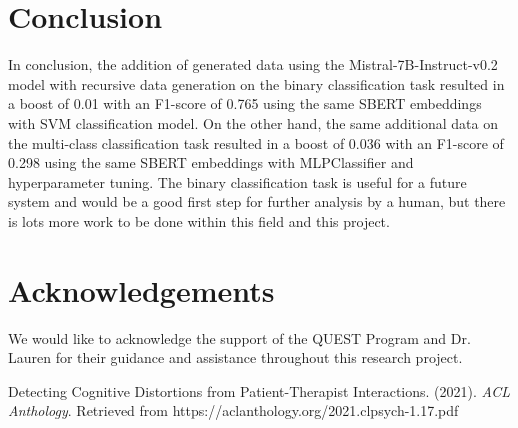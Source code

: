 \documentclass[a0,landscape]{a0poster}
\begin{document}
\begin{multicols}{4}
\color{Teal}
\section*{Conclusion}
\color{Black}

In conclusion, the addition of generated data using the Mistral-7B-Instruct-v0.2 model with recursive data generation on the binary classification task 
resulted in a boost of 0.01 with an F1-score of 0.765 using the same SBERT embeddings with SVM classification model. 
On the other hand, the same additional data on the multi-class classification task resulted in a boost of 0.036 with an F1-score of 0.298 
using the same SBERT embeddings with MLPClassifier and hyperparameter tuning.
The binary classification task is useful for a future system and would be a good first step for further analysis by a human, but there is lots more work to be done 
within this field and this project.

\color{Teal}
\section*{Acknowledgements}
\color{Black}

We would like to acknowledge the support of the QUEST Program and Dr. Lauren for their guidance and assistance throughout this research project.

\color{Teal}
\begin{thebibliography}{9}
\color{Black}

Detecting Cognitive Distortions from Patient-Therapist Interactions. (2021). \textit{ACL Anthology}. Retrieved from https://aclanthology.org/2021.clpsych-1.17.pdf
\end{thebibliography}

\end{multicols}
\end{document}
